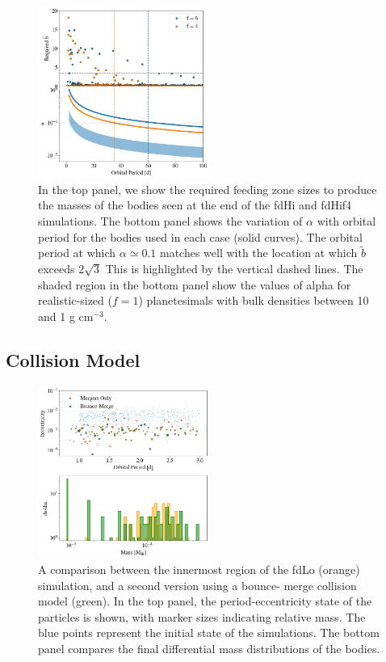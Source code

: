 \begin{figure}
\begin{center}
    \includegraphics[width=0.5\textwidth]{figures/plStip/f6f4_b.png}
    \caption{In the top panel, we show the required feeding zone sizes to produce the masses of the bodies seen
    at the end of the fdHi and fdHif4 simulations.  The bottom panel shows the variation of $\alpha$ with orbital period for the 
    bodies used in each case (solid curves). The orbital period at which $\alpha \simeq 0.1$ matches well with the location at 
    which $\tilde{b}$ exceeds $2 \sqrt{3}$ This is highlighted by the vertical dashed lines. The shaded region
    in the bottom panel show the values of alpha for realistic-sized ($f=1$) planetesimals with bulk densities between 10 and 1 g cm$^{-3}$.\label{fig:f6f4_b}}
\end{center}
\end{figure}

\subsection{Collision Model}

\begin{figure}
\begin{center}
    \includegraphics[width=0.5\textwidth]{figures/plStip/frag_ecc.png}
    \caption{A comparison between the innermost region of the fdLo (orange) simulation, and a second version using a bounce-
    merge collision model (green). In the top panel, the period-eccentricity state of the particles is shown, with marker sizes 
    indicating relative mass. The blue points represent the initial state of the simulations. The bottom panel compares the final 
    differential mass distributions of the bodies. \label{fig:frag_ecc}}
\end{center}
\end{figure}

